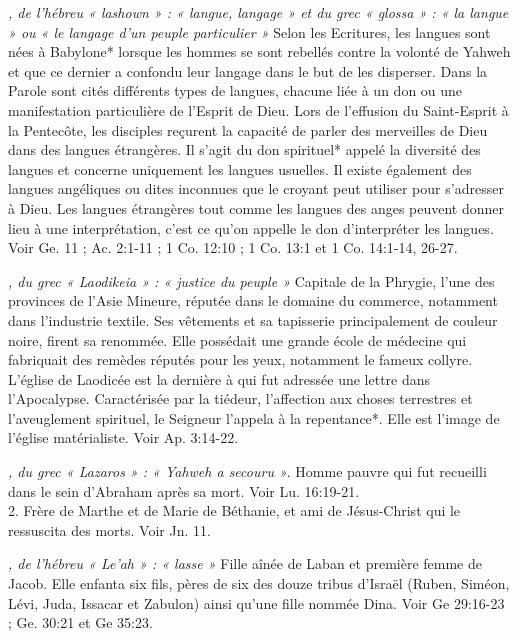 \begin{multicols}{2}
{\textit{, de l'hébreu « lashown » : « langue, langage » et du grec « glossa » : « la langue » ou « le langage d'un peuple particulier »}\newline
Selon les Ecritures, les langues sont nées à Babylone* lorsque les hommes se sont rebellés contre la volonté de Yahweh et que ce dernier a confondu leur langage dans le but de les disperser. Dans la Parole sont cités différents types de langues, chacune liée à un don ou une manifestation particulière de l'Esprit de Dieu. Lors de l'effusion du Saint-Esprit à la Pentecôte, les disciples reçurent la capacité de parler des merveilles de Dieu dans des langues étrangères. Il s'agit du don spirituel* appelé la diversité des langues et concerne uniquement les langues usuelles. Il existe également des langues angéliques ou dites inconnues que le croyant peut utiliser pour s'adresser à Dieu. Les langues étrangères tout comme les langues des anges peuvent donner lieu à une interprétation, c'est ce qu'on appelle le don d'interpréter les langues. Voir Ge. 11 ; Ac. 2:1-11 ; 1 Co. 12:10 ; 1 Co. 13:1 et 1 Co. 14:1-14, 26-27.

\textit{, du grec « Laodikeia » : « justice du peuple »}\newline
Capitale de la Phrygie, l'une des provinces de l'Asie Mineure, réputée dans le domaine du commerce, notamment dans l'industrie textile. Ses vêtements et sa tapisserie principalement de couleur noire, firent sa renommée. Elle possédait une grande école de médecine qui fabriquait des remèdes réputés pour les yeux, notamment le fameux collyre. L'église de Laodicée est la dernière à qui fut adressée une lettre dans l'Apocalypse. Caractérisée par la tiédeur, l'affection aux choses terrestres et l'aveuglement spirituel, le Seigneur l'appela à la repentance*. Elle est l'image de l'église matérialiste. Voir Ap. 3:14-22.

\textit{, du grec « Lazaros » : « Yahweh a secouru »}. Homme pauvre qui fut recueilli dans le sein d'Abraham après sa mort. Voir Lu. 16:19-21.
\\2. Frère de Marthe et de Marie de Béthanie, et ami de Jésus-Christ qui le ressuscita des morts. Voir Jn. 11.

\textit{, de l'hébreu « Le'ah » : « lasse »}\newline
Fille aînée de Laban et première femme de Jacob. Elle enfanta six fils, pères de six des douze tribus d'Israël (Ruben, Siméon, Lévi, Juda, Issacar et Zabulon) ainsi qu'une fille nommée Dina. Voir Ge 29:16-23 ; Ge. 30:21 et Ge 35:23.

}
\end{multicols}
